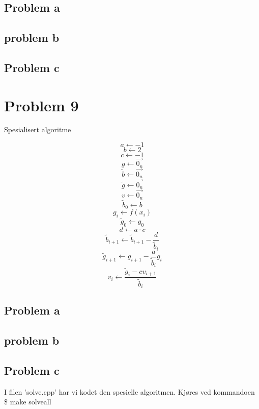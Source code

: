 \documentclass[english,notitlepage]{revtex4-1}  %
\begin{document}
\subsection*{Problem a}
\subsection*{problem b}
\subsection*{Problem c}

\section*{Problem 9}


\begin{algorithm}[H]
	\caption{Spesialisert algoritme}\label{algo:spec}
	\begin{algorithmic}
	\State $$a \leftarrow -1$$
	\State $$b \leftarrow 2$$
	\State $$c \leftarrow -1$$
	\State $$g \leftarrow \overrightarrow{0_n}$$
	\State $$\widetilde{b} \leftarrow \overrightarrow{0_n}$$
	\State $$\widetilde{g} \leftarrow \overrightarrow{0_n}$$
	\State $$v \leftarrow \overrightarrow{0_n}$$
	\State $$\widetilde{b}_0 \leftarrow b$$
	 
	\State $$g_i \leftarrow f(x_i)$$
	\EndFor
	\State $$\widetilde{g}_0 \leftarrow g_0$$
	\State $$d \leftarrow a \cdot c$$
	 
	\State $$\widetilde{b}_{i+1} \leftarrow \widetilde{b}_{i+1} - \frac{d}{\widetilde{b}_i}$$ 
	\State $$\widetilde{g}_{i+1} \leftarrow g_{i+1} - \frac{a}{\widetilde{b}_i}g_i$$ 
	\EndFor
	 
	\State $$v_i \leftarrow \frac{\widetilde{g}_i - cv_{i+1}}{\widetilde{b}_i}$$ 
	\EndFor
	\end{algorithmic}
\end{algorithm}

\subsection*{Problem a}
\subsection*{problem b}
\subsection*{Problem c}

I filen 'solve.cpp' har vi kodet den spesielle algoritmen. Kjøres ved kommandoen \\

\$ make solveall
\end{document}
